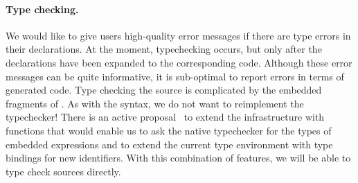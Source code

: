 \paragraph{Type checking.}
We would like to give users high-quality error messages if there
are type errors in their \forest{} declarations.  At the moment, 
typechecking occurs, but only after the \forest{} declarations have
been expanded to the corresponding \haskell{} code.  Although these
error messages can be quite informative, it is sub-optimal to report
errors in terms of generated code.  Type checking the \forest{} source
is complicated by the embedded fragments of \haskell{}.  As with the
syntax, we do not want to reimplement the \haskell{} typechecker!  
There is an active proposal~\cite{extend-templates} to extend the \template{} infrastructure
with functions that would enable us to ask the native \haskell{}
typechecker for the types of embedded expressions and to extend the
current type environment with type bindings for new identifiers.  With
this combination of features, we will be able to type check \forest{}
sources directly.

